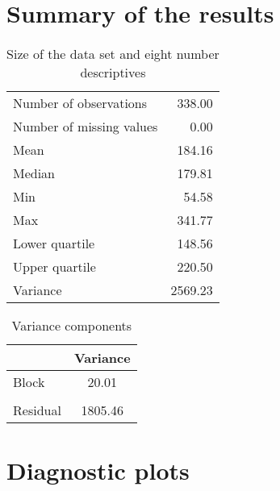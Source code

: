\documentclass[a4paper,11pt]{article}\usepackage[]{graphicx}\usepackage[]{color}
\begin{document}
\newpage
\section{Summary of the results}

\begin{table}[ht]
\begin{flushleft}
\caption{Size of the data set and eight number descriptives} 
\label{modelSummary}
\begin{tabular}{lr}
  \hline
  \hline
Number of observations & 338.00 \\ 
  Number of missing values & 0.00 \\ 
  Mean & 184.16 \\ 
  Median & 179.81 \\ 
  Min & 54.58 \\ 
  Max & 341.77 \\ 
  Lower quartile & 148.56 \\ 
  Upper quartile & 220.50 \\ 
  Variance & 2569.23 \\ 
   \hline
\end{tabular}
\end{flushleft}
\end{table}


\begin{table}[ht]
\begin{flushleft}
\caption{Variance components} 
\label{varComps}
\begin{tabular}{lc}
  \hline
 & Variance \\ 
  \hline
Block & 20.01 \\ 
   &  \\ 
  Residual & 1805.46 \\ 
   \hline
\end{tabular}
\end{flushleft}
\end{table}

\clearpage

\section{Diagnostic plots}
\end{document}
